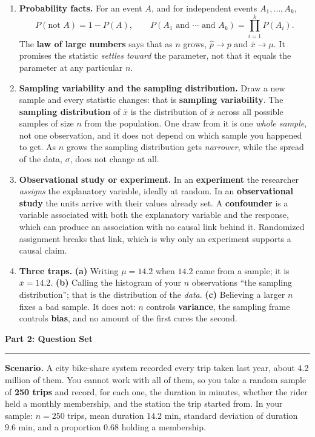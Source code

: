 \documentclass[11pt]{article}
\newcommand{\parttitle}[1]{%
  \par\medskip\noindent
  {\large\bfseries #1}\par
  \vspace{-.5em}\noindent\rule{\linewidth}{0.4pt}\par\smallskip}
\begin{document}
{\begin{enumerate}[label=\textbf{\arabic*.}, wide=0pt, itemsep=.55em, topsep=.5em]
\item \textbf{Probability facts.} For an event $A$, and for independent events $A_1,\dots,A_k$,
\[
P(\text{not } A) = 1 - P(A),
\qquad
P(A_1 \text{ and } \cdots \text{ and } A_k) = \prod_{i=1}^{k} P(A_i).
\]
The \textbf{law of large numbers} says that as $n$ grows, $\hat{p} \to p$ and $\bar{x} \to \mu$.
It promises the statistic \emph{settles toward} the parameter, not that it equals the parameter
at any particular $n$.

\item \textbf{Sampling variability and the sampling distribution.} Draw a new sample and every
statistic changes: that is \textbf{sampling variability}. The \textbf{sampling distribution} of
$\bar{x}$ is the distribution of $\bar{x}$ across all possible samples of size $n$ from the
population. One draw from it is one \emph{whole sample}, not one observation, and it does not
depend on which sample you happened to get. As $n$ grows the sampling distribution gets
\emph{narrower}, while the spread of the data, $\sigma$, does not change at all.

\item \textbf{Observational study or experiment.} In an \textbf{experiment} the researcher
\emph{assigns} the explanatory variable, ideally at random. In an \textbf{observational study}
the units arrive with their values already set. A \textbf{confounder} is a variable associated
with both the explanatory variable and the response, which can produce an association with no
causal link behind it. Randomized assignment breaks that link, which is why only an experiment
supports a causal claim.

\item \textbf{Three traps.} \textbf{(a)} Writing $\mu = 14.2$ when $14.2$ came from a sample; it
is $\bar{x} = 14.2$. \textbf{(b)} Calling the histogram of your $n$ observations ``the sampling
distribution''; that is the distribution of the \emph{data}. \textbf{(c)} Believing a larger $n$
fixes a bad sample. It does not: $n$ controls \textbf{variance}, the sampling frame controls
\textbf{bias}, and no amount of the first cures the second.

\end{enumerate}

}

\newpage

\parttitle{Part 2: Question Set}

\noindent\textbf{Scenario.} A city bike-share system recorded every trip taken last year, about
4.2 million of them. You cannot work with all of them, so you take a random sample of
\textbf{250 trips} and record, for each one, the duration in minutes, whether the rider held a
monthly membership, and the station the trip started from. In your sample: $n = 250$ trips, mean
duration $14.2$ min, standard deviation of duration $9.6$ min, and a proportion $0.68$ holding a
membership.
\end{document}
